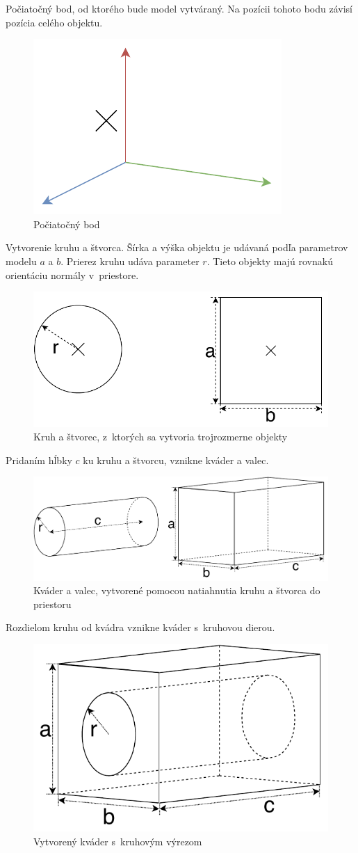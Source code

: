 Počiatočný bod, od ktorého bude model vytváraný. Na pozícii tohoto bodu závisí pozícia celého objektu.\nopagebreak
\begin{figure}[H]
	\centering
	\includegraphics[height=0.3\textwidth]{obrazky-figures/Examples/A1.pdf}
	\caption{Počiatočný bod}
	\label{fig:A1}
\end{figure}
Vytvorenie kruhu a štvorca. Šírka a výška objektu je udávaná podľa parametrov modelu $a$ a $b$. Prierez kruhu udáva parameter $r$. Tieto objekty majú rovnakú orientáciu normály v~priestore.
\nopagebreak
\begin{figure}[H]
	\centering
	\includegraphics[height=0.3\textwidth]{obrazky-figures/Examples/A2.pdf}
	\caption{Kruh a štvorec,  z~ktorých sa vytvoria trojrozmerne objekty}
	\label{fig:A2}
\end{figure}
Pridaním hĺbky $c$ ku kruhu a štvorcu, vznikne kváder a valec.
\nopagebreak
\begin{figure}[H]
	\centering
	\includegraphics[height=0.3\textwidth]{obrazky-figures/Examples/A3.pdf}
	\caption{Kváder a valec, vytvorené pomocou natiahnutia kruhu a štvorca do priestoru}
	\label{fig:A3}
\end{figure}
Rozdielom kruhu od kvádra vznikne kváder s~kruhovou dierou.
\nopagebreak
\begin{figure}[H]
	\centering
	\includegraphics[height=0.3\textwidth]{obrazky-figures/Examples/A4.pdf}
	\caption{Vytvorený kváder s~kruhovým výrezom}
	\label{fig:A4}
\end{figure}

